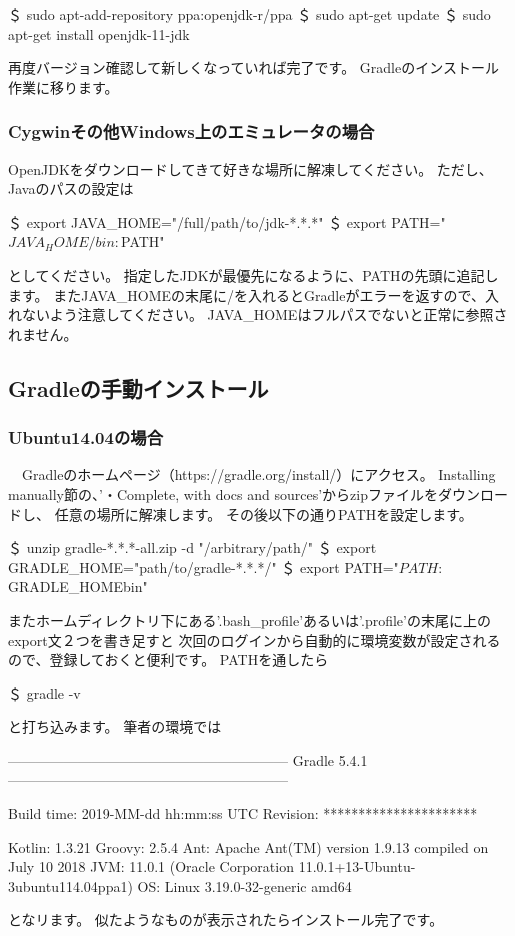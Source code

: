 \documentclass[a4paper,12pt]{article}
\begin{document}
\begin{shell}
＄ sudo apt-add-repository ppa:openjdk-r/ppa
＄ sudo apt-get update
＄ sudo apt-get install openjdk-11-jdk
\end{shell}
再度バージョン確認して新しくなっていれば完了です。
Gradleのインストール作業に移ります。

\subsubsection{Cygwinその他Windows上のエミュレータの場合}

OpenJDKをダウンロードしてきて好きな場所に解凍してください。
ただし、Javaのパスの設定は
\begin{shell}[JDKのPATHの設定]
＄ export JAVA_HOME="/full/path/to/jdk-*.*.*"
＄ export PATH="${JAVA_HOME}/bin:${PATH}"
\end{shell}
としてください。
指定したJDKが最優先になるように、PATHの先頭に追記します。
またJAVA\_HOMEの末尾に/を入れるとGradleがエラーを返すので、入れないよう注意してください。
JAVA\_HOMEはフルパスでないと正常に参照されません。

\subsection{Gradleの手動インストール}

\subsubsection{Ubuntu14.04の場合}

　Gradleのホームページ（https://gradle.org/install/）にアクセス。
Installing manually節の、'・Complete, with docs and sources'からzipファイルをダウンロードし、
任意の場所に解凍します。
その後以下の通りPATHを設定します。

\begin{shell}[PATHの設定]
＄ unzip gradle-*.*.*-all.zip -d "/arbitrary/path/"
＄ export GRADLE_HOME="path/to/gradle-*.*.*/"
＄ export PATH="${PATH}:${GRADLE_HOME}bin"
\end{shell}
またホームディレクトリ下にある'.bash\_profile'あるいは'.profile'の末尾に上のexport文２つを書き足すと
次回のログインから自動的に環境変数が設定されるので、登録しておくと便利です。
PATHを通したら
\begin{shell}[セットアップの確認]
＄ gradle -v
\end{shell}
と打ち込みます。
筆者の環境では
\begin{shell}[Gradleのバージョン表示(例)]
------------------------------------------------------------
Gradle 5.4.1
------------------------------------------------------------

Build time:   2019-MM-dd hh:mm:ss UTC
Revision:     **********************

Kotlin:       1.3.21
Groovy:       2.5.4
Ant:          Apache Ant(TM) version 1.9.13 compiled on July 10 2018
JVM:          11.0.1 (Oracle Corporation 11.0.1+13-Ubuntu-3ubuntu114.04ppa1)
OS:           Linux 3.19.0-32-generic amd64

\end{shell}
となリます。
似たようなものが表示されたらインストール完了です。
\end{document}
